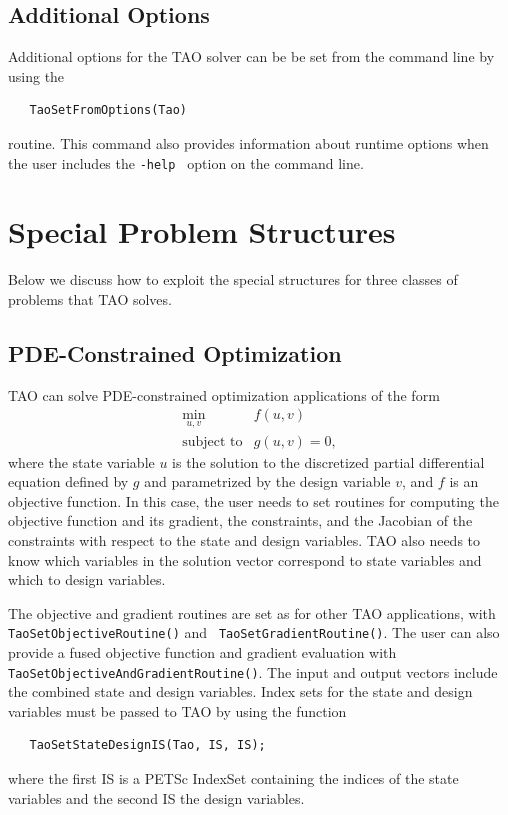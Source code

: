 \documentclass[]{book}
\begin{document}
\subsection{Additional Options}
Additional options for the TAO solver 
can be be set from the command line by using the  %
\begin{verbatim}
   TaoSetFromOptions(Tao)
\end{verbatim}
routine. 
This command also provides information about runtime options when the
user includes the {\tt -help } option on the command line.

\section{Special Problem Structures}
Below we discuss how to exploit the special structures for three classes
of problems that TAO solves. 

\subsection{PDE-Constrained Optimization}\label{sec_pde_applications}
TAO can solve PDE-constrained optimization applications 
of the form
\[
\begin{array}{ll}
\displaystyle \min_{u,v} & f(u,v) \\
\mbox{subject to} & g(u,v) = 0,
\end{array}
\]
where the state variable $u$ is the solution to the discretized partial 
differential equation defined by $g$ and parametrized by the design 
variable $v$, and $f$ is an objective function.  In this case, the 
user needs to set routines for computing the objective function
and its gradient, the constraints, and the Jacobian of the constraints
with respect to the state and design variables.  TAO also needs to know 
which variables in the solution vector correspond to state variables 
and which to design variables.

The objective and gradient routines are set as for other TAO applications,
with {\tt Tao\-Set\-Object\-ive\-Routine()} and {\tt
Tao\-Set\-Gradient\-Routine()}.  The user can also provide a fused
objective function and gradient
evaluation with {\tt Tao\-Set\-Objective\-And\-Gradient\-Routine()}.
The input and output vectors include the combined state and design 
variables.  Index sets for the state and design variables must be 
passed to TAO by using the function
\begin{verbatim}
   TaoSetStateDesignIS(Tao, IS, IS);
\end{verbatim}
where the first IS is a PETSc Index\-Set containing the indices of the
state variables and the second IS the design variables.
\end{document}
